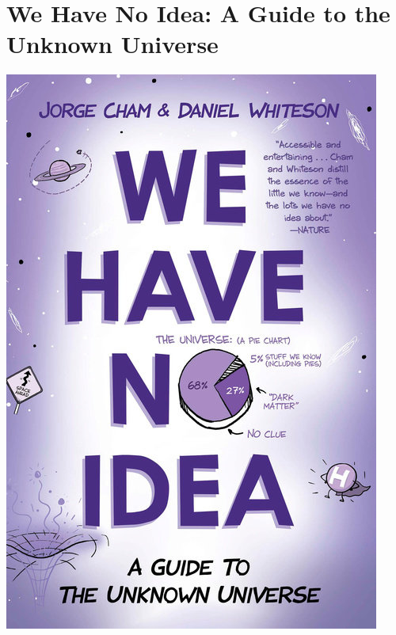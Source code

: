 \documentclass{tufte-handout}
\makeatletter
\newcommand{\varcaption}[2][0pt]{%
  \gsetlength{\@tufte@caption@vertical@offset}{-#1}%
  \gdef\@tufte@stored@varcaption{#2}%
}
\gdef\@tufte@stored@varcaption{} %
\makeatother
\begin{document}
\section*{We Have No Idea: A Guide to the Unknown Universe}
\begin{marginfigure}[8\baselineskip]
   \includegraphics[width=\linewidth]{images/we_have_no_idea.jpg}
   \varcaption{\href{https://www.penguinrandomhouse.com/books/545019/we-have-no-idea-by-jorge-cham-and-daniel-whiteson/}{Publisher Link}, \href{https://www.amazon.com/We-Have-No-Idea-Universe/dp/0735211523/}{Amazon Link}}
\end{marginfigure}
\end{document}
